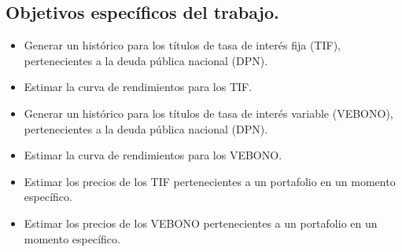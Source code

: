 \subsection{Objetivos espec\'ificos del trabajo.}

\begin{itemize}
  \item Generar un hist\'orico para los t\'itulos de tasa de inter\'es fija (TIF), pertenecientes a la deuda p\'ublica nacional (DPN).
  \item Estimar la curva de rendimientos para los TIF.
  \item Generar un hist\'orico para los t\'itulos de tasa de inter\'es variable (VEBONO), pertenecientes a la deuda p\'ublica nacional (DPN).
  \item Estimar la curva de rendimientos para los VEBONO.
  \item Estimar los precios de los TIF pertenecientes a un portafolio en un momento espec\'ifico.
  \item Estimar los precios de los VEBONO pertenecientes a un portafolio en un momento espec\'ifico.

\end{itemize}



